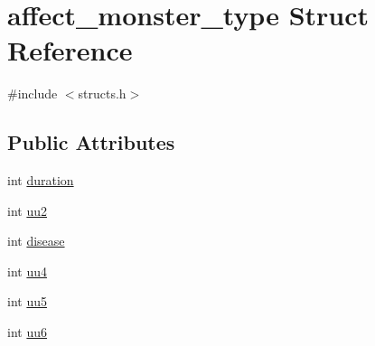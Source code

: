 \hypertarget{structaffect__monster__type}{\section{affect\-\_\-monster\-\_\-type Struct Reference}
\label{structaffect__monster__type}
}


{\ttfamily \#include $<$structs.\-h$>$}

\subsection*{Public Attributes}
\begin{DoxyCompactItemize}
\item 
int \hyperlink{structaffect__monster__type_a001bc28584d7c48880a0820b3bc3565f}{duration}
\item 
int \hyperlink{structaffect__monster__type_aba6dd6a2b50d5b03a34a5b1d3af43314}{uu2}
\item 
int \hyperlink{structaffect__monster__type_abad9064f9415bf90b1e7b02bca2acae5}{disease}
\item 
int \hyperlink{structaffect__monster__type_a7f70785dd18139e7b29a169759a17fec}{uu4}
\item 
int \hyperlink{structaffect__monster__type_ab6ab151504902a754d408ac7fd873b42}{uu5}
\item 
int \hyperlink{structaffect__monster__type_a08082a9e069912f4add89f125ae1e1e7}{uu6}
\end{DoxyCompactItemize}


